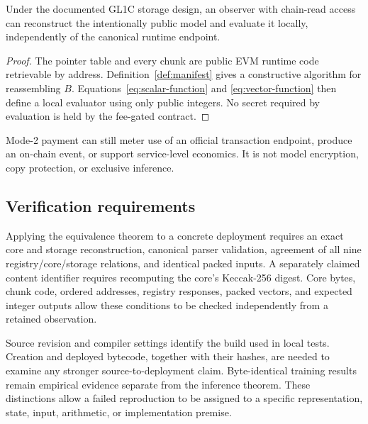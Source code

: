 \begin{proposition}
\label{prop:public-model}
Under the documented GL1C storage design, an observer with chain-read access can
reconstruct the intentionally public model and evaluate it locally,
independently of the canonical runtime endpoint.
\end{proposition}

\begin{proof}
The pointer table and every chunk are public EVM runtime code retrievable by
address.  Definition~\ref{def:manifest} gives a constructive algorithm for
reassembling $B$.  Equations~\ref{eq:scalar-function} and
\ref{eq:vector-function} then define a local evaluator using only public
integers.  No secret required by evaluation is held by the fee-gated
contract.
\end{proof}

\begin{remark}
Mode-2 payment can still meter use of an official transaction endpoint,
produce an on-chain event, or support service-level economics.  It is not
model encryption, copy protection, or exclusive inference.
\end{remark}

\subsection{Verification requirements}

Applying the equivalence theorem to a concrete deployment requires an exact
core and storage reconstruction, canonical parser validation, agreement of
all nine registry/core/storage relations, and identical packed inputs.
A separately claimed content identifier requires recomputing the core's
Keccak-256 digest. Core bytes, chunk code, ordered addresses, registry
responses, packed vectors, and expected integer outputs allow these
conditions to be checked independently from a retained observation.

Source revision and compiler settings identify the build used in local
tests. Creation and deployed bytecode, together with their hashes, are
needed to examine any stronger source-to-deployment claim. Byte-identical
training results remain empirical evidence separate from the inference
theorem. These distinctions allow a failed reproduction to be assigned to a
specific representation, state, input, arithmetic, or implementation
premise.
